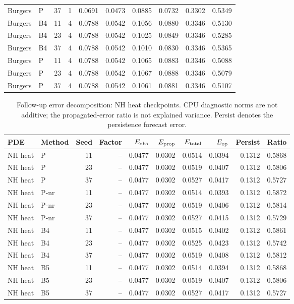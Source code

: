 \begin{table}[ht]
\begin{tabular}{@{}llrrrrrrrr@{}}
Burgers & P & 37 & 1 & 0.0691 & 0.0473 & 0.0885 & 0.0732 & 0.3302 & 0.5349\\
Burgers & B4 & 11 & 4 & 0.0788 & 0.0542 & 0.1056 & 0.0880 & 0.3346 & 0.5130\\
Burgers & B4 & 23 & 4 & 0.0788 & 0.0542 & 0.1025 & 0.0849 & 0.3346 & 0.5285\\
Burgers & B4 & 37 & 4 & 0.0788 & 0.0542 & 0.1010 & 0.0830 & 0.3346 & 0.5365\\
Burgers & P & 11 & 4 & 0.0788 & 0.0542 & 0.1065 & 0.0883 & 0.3346 & 0.5088\\
Burgers & P & 23 & 4 & 0.0788 & 0.0542 & 0.1067 & 0.0888 & 0.3346 & 0.5079\\
Burgers & P & 37 & 4 & 0.0788 & 0.0542 & 0.1061 & 0.0881 & 0.3346 & 0.5107\\
\bottomrule\end{tabular}
\end{table}
\begin{table}[ht]
\centering\small
\caption{Follow-up error decomposition: NH heat checkpoints. CPU diagnostic norms are not additive; the propagated-error ratio is not explained variance. Persist denotes the persistence forecast error.}
\begin{tabular}{@{}llrrrrrrrr@{}}\toprule
PDE & Method & Seed & Factor & $E_{\rm obs}$ & $E_{\rm prop}$ & $E_{\rm total}$ & $E_{\rm op}$ & Persist & Ratio\\\midrule
NH heat & P & 11 & -- & 0.0477 & 0.0302 & 0.0514 & 0.0394 & 0.1312 & 0.5868\\
NH heat & P & 23 & -- & 0.0477 & 0.0302 & 0.0519 & 0.0407 & 0.1312 & 0.5806\\
NH heat & P & 37 & -- & 0.0477 & 0.0302 & 0.0527 & 0.0417 & 0.1312 & 0.5727\\
NH heat & P-nr & 11 & -- & 0.0477 & 0.0302 & 0.0514 & 0.0393 & 0.1312 & 0.5872\\
NH heat & P-nr & 23 & -- & 0.0477 & 0.0302 & 0.0519 & 0.0406 & 0.1312 & 0.5814\\
NH heat & P-nr & 37 & -- & 0.0477 & 0.0302 & 0.0527 & 0.0415 & 0.1312 & 0.5729\\
NH heat & B4 & 11 & -- & 0.0477 & 0.0302 & 0.0515 & 0.0402 & 0.1312 & 0.5861\\
NH heat & B4 & 23 & -- & 0.0477 & 0.0302 & 0.0525 & 0.0423 & 0.1312 & 0.5742\\
NH heat & B4 & 37 & -- & 0.0477 & 0.0302 & 0.0519 & 0.0408 & 0.1312 & 0.5812\\
NH heat & B5 & 11 & -- & 0.0477 & 0.0302 & 0.0514 & 0.0394 & 0.1312 & 0.5868\\
NH heat & B5 & 23 & -- & 0.0477 & 0.0302 & 0.0519 & 0.0407 & 0.1312 & 0.5806\\
NH heat & B5 & 37 & -- & 0.0477 & 0.0302 & 0.0527 & 0.0417 & 0.1312 & 0.5727\\
\bottomrule\end{tabular}
\end{table}

